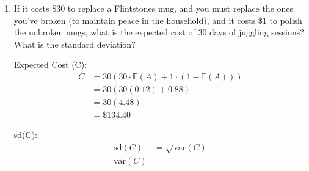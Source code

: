 \begin{enumerate}[label=(\alph*)]
        \pagebreak

        \item If it costs \$30 to replace a Flintstones mug, and you must replace the ones you've broken (to maintain peace in the household), and it costs \$1 to polish the unbroken mugs, what is the expected cost of 30 days of juggling sessions? What is the
        standard deviation?
        \\
        \begin{mdframed}
            Expected Cost (C): 
            \begin{align*}
                C   & = 30(30 \cdot \mathbb{E}(A) + 1 \cdot (1 - \mathbb{E}(A)))    \\
                    & = 30(30(0.12) + 0.88) \\
                    & = 30(4.48)            \\
                    & = \boxed{\$134.40}
            \end{align*}

            sd(C):
            \begin{align*}
                \text{sd}(C)    & = \sqrt{\text{var}(C)}    \\
                \text{var}(C)   & = 
            \end{align*}
        \end{mdframed}
    \end{enumerate}

